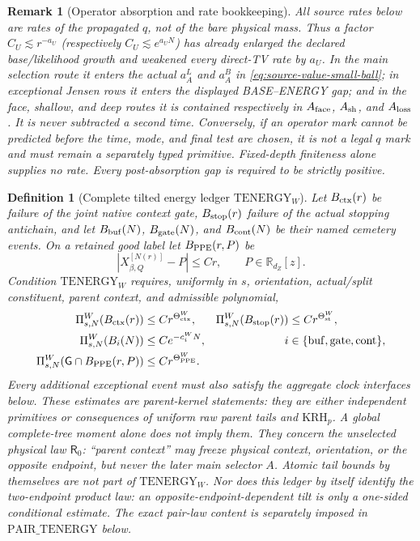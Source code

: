 \documentclass[11pt]{article}
\newtheorem{definition}[theorem]{Definition}
\newtheorem{remark}[theorem]{Remark}
\begin{document}
\begin{remark}[Operator absorption and rate bookkeeping]
\label{rem:operator-absorption-rates}
All source rates below are rates of the propagated $q$, not of the bare
physical mass.  Thus a factor $C_U\lesssim r^{-a_U}$ (respectively
$C_U\lesssim e^{a_UN}$) has already enlarged the declared base/likelihood
growth and weakened every direct-TV rate by $a_U$.  In the main selection
route it enters the actual $a_A^L$ and $a_A^B$ in
\eqref{eq:source-value-small-ball}; in exceptional Jensen rows it enters the
displayed BASE--ENERGY gap; and in the face, shallow, and deep routes it is
contained respectively in $A_{\rm face}$, $A_{\rm sh}$, and $A_{\rm loss}$.
It is never subtracted a second time.  Conversely, if an operator mark cannot
be predicted before the time, mode, and final test are chosen, it is not a
legal $q$ mark and must remain a separately typed primitive.  Fixed-depth
finiteness alone supplies no rate.  Every post-absorption gap is required to
be strictly positive.
\end{remark}

\begin{definition}[Complete tilted energy ledger
$\mathrm{TENERGY}_{W}$]
\label{def:tilted-energy-ledger}
Let $B_{\rm ctx}(r)$ be failure of the joint native context gate,
$B_{\rm stop}(r)$ failure of the actual stopping antichain, and let
$B_{\rm buf}(N)$, $B_{\rm gate}(N)$, and $B_{\rm cont}(N)$ be their named
cemetery events.  On a retained good label let $B_{\rm PPE}(r,P)$ be
\[
 |X^{[N(r)]}_{\beta,Q}-P|\le Cr,
 \qquad P\in\mathbb R_{d_Z}[z].
\]
Condition $\mathrm{TENERGY}_{W}$ requires, uniformly in $s$, orientation,
actual/split constituent, parent context, and admissible polynomial,
\begin{align}
 \Pi_{s,N}^{W}(B_{\rm ctx}(r))&\le Cr^{\Theta_{\rm ctx}^{W}},&
 \Pi_{s,N}^{W}(B_{\rm stop}(r))&\le Cr^{\Theta_{\rm st}^{W}},
 \label{eq:tilted-context-stop-tails}\\
 \Pi_{s,N}^{W}(B_i(N))&\le Ce^{-c_i^{W}N},
 &i&\in\{\mathrm{buf},\mathrm{gate},\mathrm{cont}\},
 \label{eq:tilted-auxiliary-tails}\\
 \Pi_{s,N}^{W}(\mathsf G\cap B_{\rm PPE}(r,P))&\le
 Cr^{\Theta_{\rm PPE}^{W}}.
 \label{eq:tilted-PPE-tail}
\end{align}
Every additional exceptional event must also satisfy the aggregate clock
interfaces below.  These estimates are parent-kernel statements: they are
either independent primitives or consequences of uniform raw parent tails
and $\mathrm{KRH}_{p}$.  A global complete-tree moment alone does not imply
them.  They concern the unselected physical law $\mathsf R_0$: ``parent
context'' may freeze physical context, orientation, or the opposite
endpoint, but never the later main selector $A$.  Atomic tail bounds by
themselves are not part of $\mathrm{TENERGY}_{W}$.  Nor does this ledger by
itself identify the two-endpoint product law: an opposite-endpoint-dependent
tilt is only a one-sided conditional estimate.  The exact pair-law content
is separately imposed in $\mathrm{PAIR\_TENERGY}$ below.
\end{definition}
\end{document}
